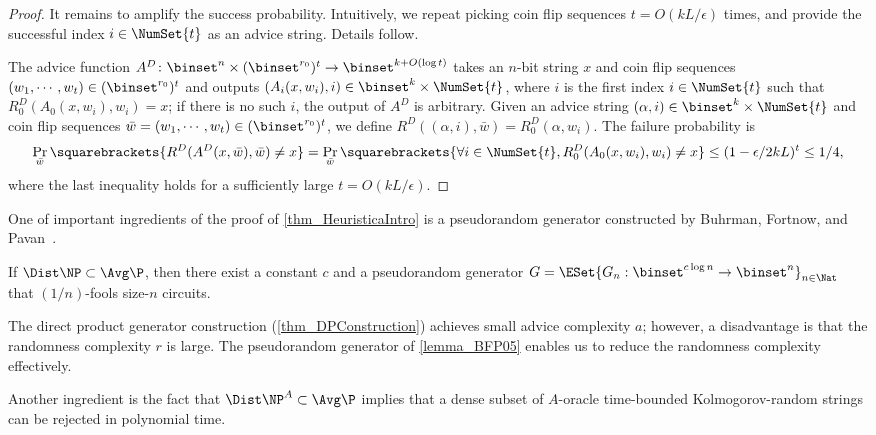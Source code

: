 \documentclass{toc}
\begin{document}
\begin{proof}
  It remains to amplify the success probability.
  Intuitively,
  we repeat picking coin flip sequences $t = O(k L / \epsilon)$ times,
  and provide the successful index $i \in \NumSet{t}$ as an advice string.
  Details follow.

  The advice function $A^D \colon \binset^n \times (\binset^{r_0})^t \to \binset^{k + O(\log t)}$
  takes an $n$-bit string $x$ and coin flip sequences $(w_1, \cdots, w_t) \in (\binset^{r_0})^t$
  and outputs
  $(A_i(x, w_i), i) \in \binset^k \times \NumSet{t}$,
  where $i$ is the first index $i \in \NumSet{t}$ such that $R_0^D(A_0(x, w_i), w_i) = x$;
  if there is no such $i$, the output of $A^D$ is arbitrary.
  Given an advice string $(\alpha, i) \in \binset^k \times \NumSet{t}$
  and coin flip sequences $\bar{w} = (w_1, \cdots, w_t) \in (\binset^{r_0})^t$,
  we define $R^D((\alpha, i), \bar{w}) = R_0^D(\alpha, w_i)$.
  The failure probability is
  $$
    \Pr_{\bar{w}} \squarebrackets{
      R^D(A^D(x, \bar{w}), \bar{w}) \neq x
    }
    =
    \Pr_{\bar{w}} \squarebrackets{
      \forall i \in \NumSet{t},
      R_0^D(A_0(x, w_i), w_i) \neq x
    }
    \le (1 - \epsilon / 2 k L)^t \le 1 / 4,
  $$
  where the last inequality holds for a sufficiently large $t =O(k L / \epsilon)$.
\end{proof}

%
%
%
%
%
%
%
%
%
%

One of important ingredients of the proof of \cref{thm_HeuristicaIntro} is
a pseudorandom generator constructed by
Buhrman, Fortnow, and Pavan~\cite{BuhrmanFP05_mst_journals}.
\begin{lemma}
  \label{lemma_BFP05}
  If $\Dist\NP \subset \Avg\P$,
  then there exist a constant $c$ and a pseudorandom generator
  $G = \ESet{G_n : \binset^{c \log n} \to \binset^n }_{n \in \Nat}$
  that $(1/n)$-fools size-$n$ circuits.
\end{lemma}

The direct product generator construction (\cref{thm_DPConstruction})
achieves small advice complexity $a$; however,
a disadvantage is that
the randomness complexity $r$ is large.
The pseudorandom generator of \cref{lemma_BFP05} enables us to reduce the randomness complexity effectively.

Another ingredient is the fact that
$\Dist\NP^A \subset \Avg\P$
implies that
a dense subset of $A$-oracle time-bounded Kolmogorov-random strings
can be rejected
in polynomial time.
%
\end{document}
